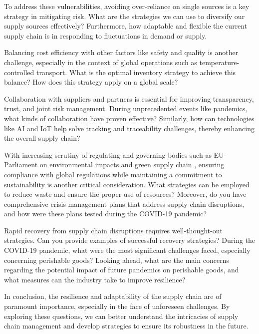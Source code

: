 To address these vulnerabilities, avoiding over-reliance on single sources is a key strategy in mitigating risk. What are the strategies we can use to diversify our supply sources effectively? Furthermore, how adaptable and flexible the current supply chain is in responding to fluctuations in demand or supply\parencite{Yin2022SupplyFsQCA, Wang2024TheCOVID-19, Lin2021TheManufacturers}.

Balancing cost efficiency with other factors like safety and quality is another challenge, especially in the context of global operations such as temperature-controlled transport. What is the optimal inventory strategy to achieve this balance? How does this strategy apply on a global scale?

Collaboration with suppliers and partners is essential for improving transparency, trust, and joint risk management. During unprecedented events like pandemics, what kinds of collaboration have proven effective? Similarly, how can technologies like AI and IoT help solve tracking and traceability challenges, thereby enhancing the overall supply chain\parencite{Wang2024TheCOVID-19, Simatupang2002TheChain, Singh2023Post-COVIDVaccination, Ramanathan2014SupplyPartnerships, Chen2017SupplyAgenda}?

With increasing scrutiny of regulating and governing bodies such as EU-Parliament on environmental impacts and green supply chain \parencite{Amann2014DrivingUnion, Moazzem2022EnvironmentalProducts}, ensuring compliance with global regulations while maintaining a commitment to sustainability is another critical consideration. What strategies can be employed to reduce waste and ensure the proper use of resources? Moreover, do you have comprehensive crisis management plans that address supply chain disruptions, and how were these plans tested during the COVID-19 pandemic?

Rapid recovery from supply chain disruptions requires well-thought-out strategies. Can you provide examples of successful recovery strategies? During the COVID-19 pandemic, what were the most significant challenges faced, especially concerning perishable goods? Looking ahead, what are the main concerns regarding the potential impact of future pandemics on perishable goods, and what measures can the industry take to improve resilience\parencite{Chowdhury2021COVID-19Review, Paul2021SupplyPandemic, Ivanov2017LiteratureChain, Chen2019BuildingIndustry}? 

In conclusion, the resilience and adaptability of the supply chain are of paramount importance, especially in the face of unforeseen challenges. By exploring these questions, we can better understand the intricacies of supply chain management and develop strategies to ensure its robustness in the future.


